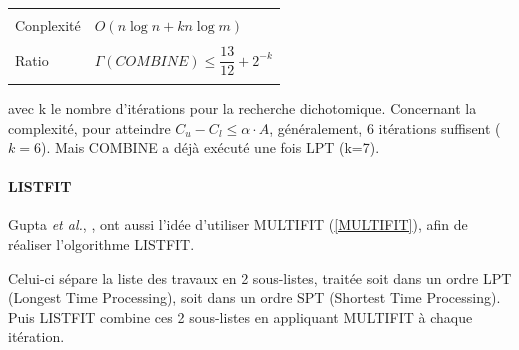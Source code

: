 \documentclass[a4paper,12pt]{report}
\theoremstyle{plain}				%
\theoremstyle{definition}				%
\begin{document}
\bigskip

\begin{flushleft}
\begin{tabular}{|p{8cm}p{6cm}|}
\hline

 & \\

Conplexité & $O(n \log n + kn \log m)$
\\	%

 & \\

Ratio \cite{gupta2001listfit} & $\Gamma(COMBINE) \leq \dfrac{13}{12} + 2^{-k}$

\\

& \\
\hline
\end{tabular}
\end{flushleft}

avec k le nombre d'itérations pour la recherche dichotomique.
Concernant la complexité, pour atteindre
$C_u - C_l \leq \alpha \cdot A$, généralement, 6 itérations suffisent
($k=6$).
Mais COMBINE a déjà exécuté une fois LPT (k=7).




\paragraph{LISTFIT}

Gupta \textit{et al.}, \cite{gupta2001listfit}, ont aussi l'idée
d'utiliser MULTIFIT (\ref{MULTIFIT}), afin de réaliser l'olgorithme
LISTFIT.

Celui-ci sépare la liste des travaux en 2 sous-listes, traitée soit
dans un ordre LPT (Longest Time Processing), soit dans un ordre SPT
(Shortest Time Processing).
Puis LISTFIT combine ces 2 sous-listes en appliquant MULTIFIT à chaque
itération.
\end{document}
